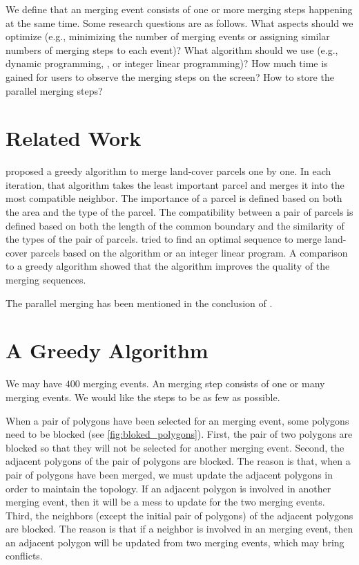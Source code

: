 \documentclass[ijgi,article,submit,moreauthors,pdftex]{Definitions/mdpi}
\begin{document}
We define that an merging event consists of 
one or more merging steps happening at the same time.
Some research questions are as follows.
What aspects should we optimize 
(e.g., minimizing the number of merging events or 
assigning similar numbers of merging steps to each event)?
What algorithm should we use 
(e.g., dynamic programming, \Astar, or integer linear programming)?
How much time is gained for users to observe the merging steps on the screen?
How to store the parallel merging steps?
 
\section{Related Work}
\citet{vanOosterom2005} proposed a greedy algorithm 
to merge land-cover parcels one by one.
In each iteration, that algorithm takes the least important parcel and 
merges it into the most compatible neighbor.
The importance of a parcel is defined 
based on both the area and the type of the parcel.
The compatibility between a pair of parcels is defined based on 
both the length of the common boundary and the similarity of the types 
of the pair of parcels. 
\citet[]{Peng2019Thesis} tried to find an optimal sequence 
to merge land-cover parcels
based on the \Astar algorithm or an integer linear program.
A comparison to a greedy algorithm showed that 
the \Astar algorithm improves the quality of the merging sequences.

The parallel merging has been mentioned in the conclusion of
\citet{Suba2014Merge}.

\citet{Suba2016Road}

\citet{Thiemann2018LandCover}


\section{A Greedy Algorithm}
We may have $400$ merging events.
An merging step consists of one or many merging events.
We would like the steps to be as few as possible.


When a pair of polygons have been selected for an merging event, 
some polygons need to be blocked (see \fig\ref{fig:bloked_polygons}).
First, the pair of two polygons are blocked so that
they will not be selected for another merging event.
Second, the adjacent polygons of the pair of polygons are blocked.
The reason is that, when a pair of polygons have been merged, 
we must update the adjacent polygons in order to maintain the topology.
If an adjacent polygon is involved in another merging event,
then it will be a mess to update for the two merging events.
Third, the neighbors (except the initial pair of polygons) 
of the adjacent polygons are blocked.
The reason is that if a neighbor is involved in an merging event,
then an adjacent polygon will be updated from two merging events,
which may bring conflicts.
\end{document}
